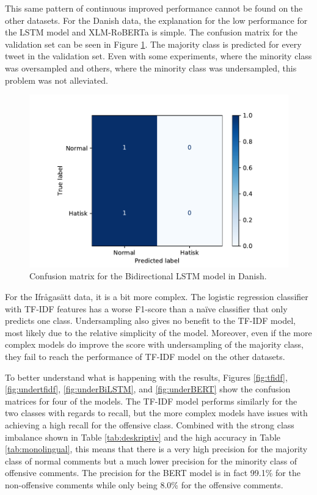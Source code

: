 \documentclass[nofilelist]{cslthse-msc}
\begin{document}
This same pattern of continuous improved performance cannot be found on the other datasets. For the Danish data, the explanation for the low performance for the LSTM model and XLM-RoBERTa is simple. The confusion matrix for the validation set can be seen in Figure \ref{fig:danlstm}. The majority class is predicted for every tweet in the validation set. Even with some experiments, where the minority class was oversampled and others, where the minority class was undersampled, this problem was not alleviated.


\begin{figure}[t]
    \centering
    \includegraphics[width=\textwidth*3/4]{bilstmcharsDanish.pdf}
    \caption{Confusion matrix for the Bidirectional LSTM model in Danish.}
    \label{fig:danlstm}
\end{figure}

For the Ifrågasätt data, it is a bit more complex. The logistic regression classifier with TF-IDF features has a worse F1-score than a naïve classifier that only predicts one class. Undersampling also gives no benefit to the TF-IDF model, most likely due to the relative simplicity of the model. Moreover, even if the more complex models do improve the score with undersampling of the majority class, they fail to reach the performance of TF-IDF model on the other datasets. 

To better understand what is happening with the results,  Figures \ref{fig:tfidf},  \ref{fig:undertfidf}, \ref{fig:underBiLSTM}, and \ref{fig:underBERT}  show the confusion matrices for four of the models. The TF-IDF model performs similarly for the two classes with regards to recall, but the more complex models have issues with achieving a high recall for the offensive class. Combined with the strong class imbalance shown in Table \ref{tab:deskriptiv} and the high accuracy in Table \ref{tab:monolingual}, this means that there is a very high precision for the majority class of normal comments but a much lower precision for the minority class of offensive comments. The precision for the BERT model is in fact 99.1\% for the non-offensive comments while only being 8.0\% for the offensive comments.
\end{document}
